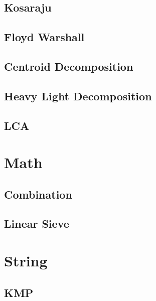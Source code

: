 \documentclass[10pt,landscape,a4paper,twocolumn]{article}
\begin{document}
\subsection{Kosaraju}


\subsection{Floyd Warshall}


\subsection{Centroid Decomposition}


\subsection{Heavy Light Decomposition}


\subsection{LCA}


\section{Math}

\subsection{Combination}


\subsection{Linear Sieve}


\section{String}

\subsection{KMP}

\end{document}
